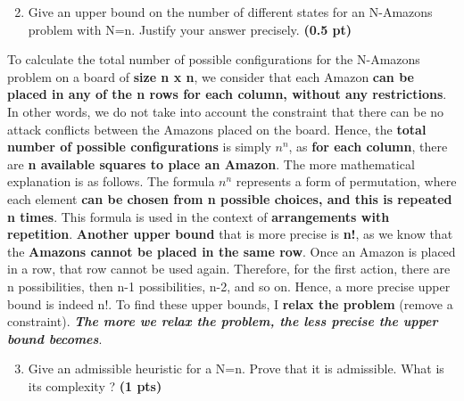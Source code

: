 \documentclass[11pt,a4paper]{report}
\begin{document}
\newpage
\begin{enumerate}
\setcounter{enumi}{1}
\item Give an upper bound on the number of different states for an N-Amazons problem with N=n. Justify your answer precisely. \textbf{(0.5 pt)}
\end{enumerate}

\begin{answers}[5cm]
\small{To calculate the total number of possible configurations for the N-Amazons problem on a board of \textbf{size n x n}, we consider that each Amazon \textbf{can be placed in any of the n rows for each column, without any restrictions}. In other words, we do not take into account the constraint that there can be no attack conflicts between the Amazons placed on the board.
Hence, the \textbf{total number of possible configurations} is simply \textbf{$n^n$}, as \textbf{for each column}, there are \textbf{n available squares to place an Amazon}. The more mathematical explanation is as follows. The formula $n^n$ represents a form of permutation, where each element \textbf{can be chosen from n possible choices, and this is repeated n times}. This formula is used in the context of \textbf{arrangements with repetition}. \textbf{Another upper bound} that is more precise is \textbf{n!}, as we know that the \textbf{Amazons cannot be placed in the same row}. Once an Amazon is placed in a row, that row cannot be used again. Therefore, for the first action, there are n possibilities, then n-1 possibilities, n-2, and so on. Hence, a more precise upper bound is indeed n!. To find these upper bounds, I \textbf{relax the problem} (remove a constraint). \textbf{\textit{The more we relax the problem, the less precise the upper bound becomes}}.}

\end{answers}



\begin{enumerate}
\setcounter{enumi}{2}
\item Give an admissible heuristic for a N=n. Prove that it is admissible. What is its complexity ? \textbf{(1 pts)}
\end{enumerate}
\end{document}
